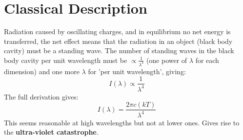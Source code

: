\documentclass[a4paper, 11pt, normalem]{report}
\begin{document}
\section{Classical Description}
Radiation caused by oscillating charges, and in equilibrium no net energy is transferred, the net effect means that the radiation in an object (black body cavity) must be a standing wave.
The number of standing waves in the black body cavity per unit wavelength must be $\propto \frac{1}{\lambda^{3}}$ (one power of $\lambda$ for each dimension) and one more $\lambda$ for 'per unit wavelength', giving:
\begin{equation}
    I(\lambda) \propto \frac{1}{\lambda^{4}}
\end{equation}
The full derivation gives:
\begin{equation}
    I(\lambda) = \frac{2\pi c(kT)}{\lambda^{4}}
\end{equation}
This seems reasonable at high wavelengths but not at lower ones.
Gives rise to the \textbf{ultra-violet catastrophe}.
\end{document}
